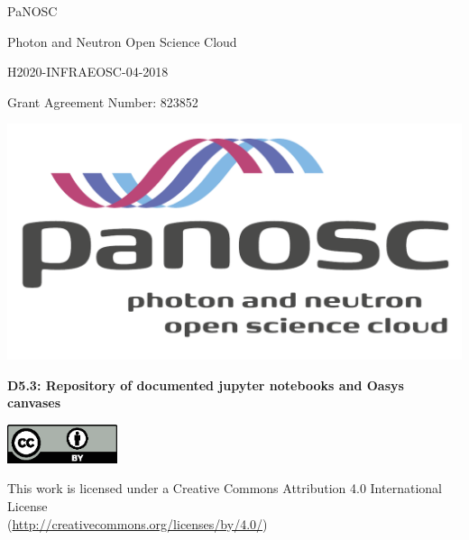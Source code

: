 \documentclass[11pt, a4paper]{article}
\begin{document}

{
	\centering
    \begin{onehalfspace}
    \sffamily
     \vspace*{5ex}
	{\fontsize{20}{24}\selectfont PaNOSC \par}
	{\fontsize{20}{24}\selectfont Photon and Neutron Open Science Cloud \par}
	{\fontsize{20}{24}\selectfont H2020-INFRAEOSC-04-2018 \par}
	{\fontsize{20}{24}\selectfont Grant Agreement Number: 823852 \par}
	\end{onehalfspace}

	\vspace*{7ex}
	\includegraphics[width=\textwidth]{PaNOSClogo_web_RGB.pdf}\par
	\vfill
	{\large \textbf{\sffamily D5.3: Repository of documented jupyter notebooks and Oasys canvases}}\par
} %


\includegraphics[width=1.27in]{by.eps}\par
This work is licensed under a Creative Commons Attribution 4.0 International License\\
(\url{http://creativecommons.org/licenses/by/4.0/})\par

\newpage
\end{document}
